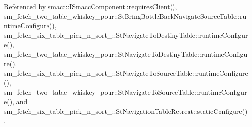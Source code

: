 Referenced by smacc\+::\+I\+Smacc\+Component\+::requires\+Client(), sm\+\_\+fetch\+\_\+two\+\_\+table\+\_\+whiskey\+\_\+pour\+::\+St\+Bring\+Bottle\+Back\+Navigate\+Source\+Table\+::runtime\+Configure(), sm\+\_\+fetch\+\_\+six\+\_\+table\+\_\+pick\+\_\+n\+\_\+sort\+\_\+::\+St\+Navigate\+To\+Destiny\+Table\+::runtime\+Configure(), sm\+\_\+fetch\+\_\+two\+\_\+table\+\_\+whiskey\+\_\+pour\+::\+St\+Navigate\+To\+Destiny\+Table\+::runtime\+Configure(), sm\+\_\+fetch\+\_\+six\+\_\+table\+\_\+pick\+\_\+n\+\_\+sort\+\_\+::\+St\+Navigate\+To\+Source\+Table\+::runtime\+Configure(), sm\+\_\+fetch\+\_\+two\+\_\+table\+\_\+whiskey\+\_\+pour\+::\+St\+Navigate\+To\+Source\+Table\+::runtime\+Configure(), and sm\+\_\+fetch\+\_\+six\+\_\+table\+\_\+pick\+\_\+n\+\_\+sort\+\_\+::\+St\+Navigation\+Table\+Retreat\+::static\+Configure().


